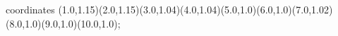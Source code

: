 					coordinates { (1.0,1.15)(2.0,1.15)(3.0,1.04)(4.0,1.04)(5.0,1.0)(6.0,1.0)(7.0,1.02)(8.0,1.0)(9.0,1.0)(10.0,1.0)};